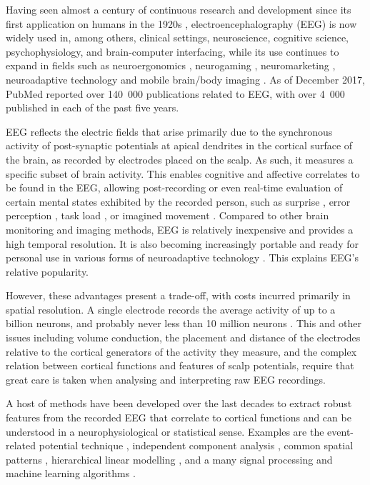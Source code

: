 Having seen almost a century of continuous research and development since its first application on humans in the 1920s \cite{berger1929humaneeg}, electroencephalography (EEG) is now widely used in, among others, clinical settings, neuroscience, cognitive science, psychophysiology, and brain-computer interfacing, while its use continues to expand in fields such as neuroergonomics \cite{parasuraman2007neuroergonomics,frey2016eegux}, neurogaming \cite{krol2017meyendtris}, neuromarketing \cite{vecchiato2011eegmegmarketing}, neuroadaptive technology \cite{zander2016nat} and mobile brain/body imaging \cite{gramann2011mobireview}. As of December 2017, PubMed reported over 140~000 publications related to EEG, with over 4~000 published in each of the past five years.

EEG reflects the electric fields that arise primarily due to the synchronous activity of post-synaptic potentials at apical dendrites in the cortical surface of the brain, as recorded by electrodes placed on the scalp. As such, it measures a specific subset of brain activity. This enables cognitive and affective correlates to be found in the EEG, allowing post-recording or even real-time evaluation of certain mental states exhibited by the recorded person, such as surprise \cite{donchin1981}, error perception \cite{falkenstein1990,blankertz2002}, task load \cite{klimesch1999eeg,muhl2014crosscontextworkload,zander2017surgery}, or imagined movement \cite{pfurtscheller2001motorimagery,blankertz2007}. Compared to other brain monitoring and imaging methods, EEG is relatively inexpensive and provides a high temporal resolution. It is also becoming increasingly portable and ready for personal use \cite{zander2017dry} in various forms of neuroadaptive technology \cite{krol2018interactivity}. This explains EEG's relative popularity.

However, these advantages present a trade-off, with costs incurred primarily in spatial resolution. A single electrode records the average activity of up to a billion neurons, and probably never less than 10 million neurons \cite{nunez2006eegneurophysics}. This and other issues including volume conduction, the placement and distance of the electrodes relative to the cortical generators of the activity they measure, and the complex relation between cortical functions and features of scalp potentials, require that great care is taken when analysing and interpreting raw EEG recordings.

A host of methods have been developed over the last decades to extract robust features from the recorded EEG that correlate to cortical functions and can be understood in a neurophysiological or statistical sense. Examples are the event-related potential technique \cite{luck2014erp}, independent component analysis \cite{makeig1996}, common spatial patterns \cite{guger2000csp}, hierarchical linear modelling \cite{pernet2011limo}, and a many signal processing and machine learning algorithms \cite{lotte2007classificationreview}.

